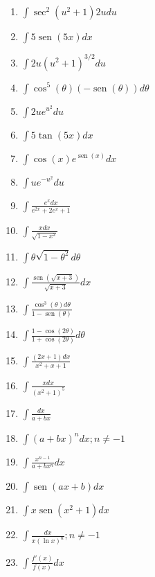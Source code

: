 \documentclass{article}
\begin{document}
\begin{multicols}{2}
\begin{enumerate}
    \item $\displaystyle \int \sec^2 (u^2 + 1) 2u du$
    \item $\displaystyle \int 5 \operatorname{sen} (5x) dx$
    \item $\displaystyle \int 2u (u^2 + 1)^{3/2} du$
    \item $\displaystyle \int \cos^5 (\theta) (-\operatorname{sen} (\theta)) d\theta$
    \item $\displaystyle \int 2ue^{u^2} du$
    \item $\displaystyle \int 5 \operatorname{tan} (5x) dx$
    \item $\displaystyle \int \cos (x) e^{\operatorname{sen} (x)} dx$
    \item $\displaystyle \int ue^{-u^2} du$
    \item $\displaystyle \int \frac{e^x dx}{e^{2x} + 2e^x + 1}$
    \item $\displaystyle \int \frac{x dx}{\sqrt{1 - x^2}}$
    \item $\displaystyle \int \theta \sqrt{1 - \theta^2} d\theta$
    \item $\displaystyle \int \frac{\operatorname{sen} (\sqrt{x + 3})}{\sqrt{x + 3}} dx$
    \item $\displaystyle \int \frac{\cos^3 (\theta) d\theta}{1 - \operatorname{sen} (\theta)}$
    \item $\displaystyle \int \frac{1 - \cos (2\theta)}{1 + \cos (2\theta)} d\theta$
    \item $\displaystyle \int \frac{(2x + 1)dx}{x^2 + x + 1}$
    \item $\displaystyle \int \frac{x dx}{(x^2 + 1)^5}$
    \item $\displaystyle \int \frac{dx}{a + bx}$
    \item $\displaystyle \int (a + bx)^n dx; n \neq -1$
    \item $\displaystyle \int \frac{x^{n-1}}{a + bx^n} dx$
    \item $\displaystyle \int \operatorname{sen}(ax + b) dx$
    \item $\displaystyle \int x \operatorname{sen}(x^2 + 1) dx$
    \item $\displaystyle \int \frac{dx}{x (\ln x)^n}; n \neq -1$
    \item $\displaystyle \int \frac{f'(x)}{f(x)} dx$
\end{enumerate}

\end{multicols}
\end{document}
